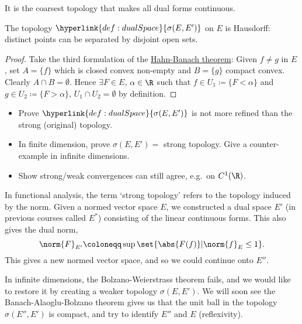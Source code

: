 \documentclass[twoside]{article}
\begin{document}
It is the coarsest topology that makes all dual forms continuous.
\begin{prop}
    The topology $\hyperlink{def:dualSpace}{\sigma(E, E')}$ on $E$ is Hausdorff: distinct points can be separated by disjoint open sets.
\end{prop}
\begin{proof}
    Take the third formulation of the \hyperlink{thm:hb}{Hahn-Banach theorem}:
    Given $f \neq g$ in $E$, set $A = \{f\}$ which is closed convex non-empty and $B=\{g\}$ compact convex. Clearly $A \cap B = \emptyset$.
    Hence $\exists F \in E$, $\alpha \in \R$ such that $f \in U_1 \coloneqq \{F < \alpha\}$ and $g \in U_2 \coloneqq \{F > \alpha\}$, $U_1 \cap U_2 = \emptyset$ by definition.
\end{proof}
\begin{remark}\leavevmode
    \begin{itemize}
        \item Prove $\hyperlink{def:dualSpace}{\sigma(E, E')}$ is not more refined than the strong (original) topology.
        \item In finite dimension, prove $\sigma(E, E') = $ strong topology. Give a counter-example in infinite dimensions.
        \item Show strong/weak convergences can still agree, e.g.\ on $C^1(\R)$.
    \end{itemize}
\end{remark}
\begin{remark}
    In functional analysis, the term `strong topology' refers to the topology induced by the norm.
    Given a normed vector space $E$, we constructed a dual space $E'$ (in previous courses called $E^*$) consisting of the linear continuous forms.
    This also gives the dual norm,
    \begin{equation*}
        \norm{F}_{E'} \coloneqq \sup\set{\abs{F(f)} | \norm{f}_E \leq 1}.
    \end{equation*}
    This gives a new normed vector space, and so we could continue onto $E''$.

    In infinite dimensions, the Bolzano-Weierstrass theorem fails, and we would like to restore it by creating a weaker topology $\sigma(E, E')$.
    We will soon see the Banach-Alaoglu-Bolzano theorem gives us that the unit ball in the topology $\sigma(E'', E')$ is compact, and try to identify $E''$ and $E$ (reflexivity).
\end{remark}
\end{document}
